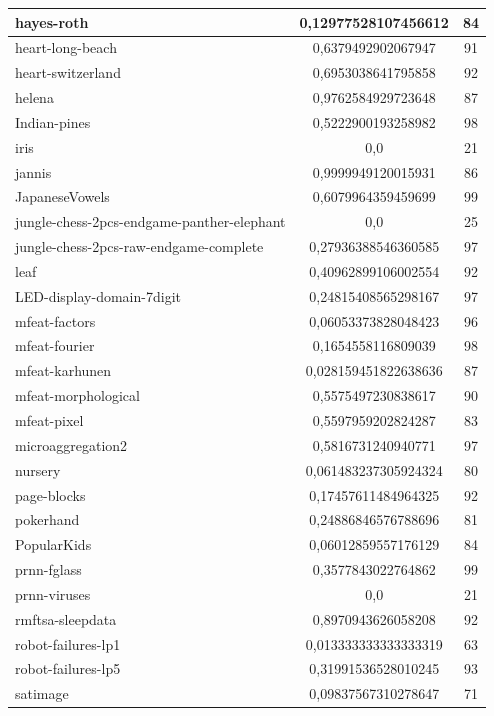 \documentclass[times,specification,annotation]{itmo-student-thesis}
\begin{document}
\begin{center}
\begin{longtable}{ |m{5cm}|c|c| }
		\hline
		hayes-roth & 0,12977528107456612 & 84 \\
		\hline
		heart-long-beach & 0,6379492902067947 & 91 \\
		\hline
		heart-switzerland & 0,6953038641795858 & 92 \\
		\hline
		helena & 0,9762584929723648 & 87 \\
		\hline
		Indian-pines & 0,5222900193258982 & 98 \\
		\hline
		iris & 0,0 & 21 \\
		\hline
		jannis & 0,9999949120015931 & 86 \\
		\hline
		JapaneseVowels & 0,6079964359459699 & 99 \\
		\hline
		jungle-chess-2pcs-endgame-panther-elephant & 0,0 & 25 \\
		\hline
		jungle-chess-2pcs-raw-endgame-complete & 0,27936388546360585 & 97 \\
		\hline
		leaf & 0,40962899106002554 & 92 \\
		\hline
		LED-display-domain-7digit & 0,24815408565298167 & 97 \\
		\hline
		mfeat-factors & 0,06053373828048423 & 96 \\
		\hline
		mfeat-fourier & 0,1654558116809039 & 98 \\
		\hline
		mfeat-karhunen & 0,028159451822638636 & 87 \\
		\hline
		mfeat-morphological & 0,5575497230838617 & 90 \\
		\hline
		mfeat-pixel & 0,5597959202824287 & 83 \\
		\hline
		microaggregation2 & 0,5816731240940771 & 97 \\
		\hline
		nursery & 0,061483237305924324 & 80 \\
		\hline
		page-blocks & 0,17457611484964325 & 92 \\
		\hline
		pokerhand & 0,24886846576788696 & 81 \\
		\hline
		PopularKids & 0,06012859557176129 & 84 \\
		\hline
		prnn-fglass & 0,3577843022764862 & 99 \\
		\hline
		prnn-viruses & 0,0 & 21 \\
		\hline
		rmftsa-sleepdata & 0,8970943626058208 & 92 \\
		\hline
		robot-failures-lp1 & 0,013333333333333319 & 63 \\
		\hline
		robot-failures-lp5 & 0,31991536528010245 & 93 \\
		\hline
		satimage & 0,09837567310278647 & 71 \\

\end{longtable}
\end{center}
\end{document}
